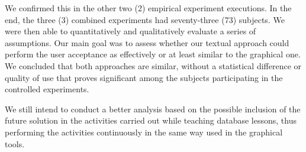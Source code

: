 We confirmed this in the other two (2) empirical experiment executions.
In the end, the three (3) combined experiments had seventy-three (73) subjects.
We were then able to quantitatively and qualitatively evaluate a series of assumptions.
Our main goal was to assess whether our textual approach could perform the user acceptance as effectively or at least similar to the graphical one.
We concluded that both approaches are similar, without a statistical difference or quality of use that proves significant among the subjects participating in the controlled experiments.


We still intend to conduct a better analysis based on the possible inclusion of the future solution in the activities carried out while teaching database lessons, thus performing the activities continuously in the same way used in the graphical tools.

